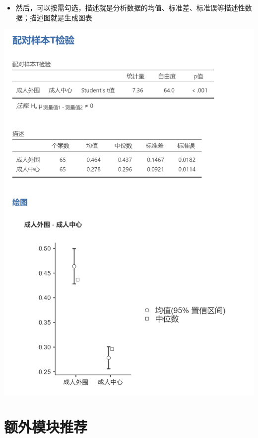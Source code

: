 \documentclass[]{ctexbook}
\providecommand{\tightlist}{%
  \setlength{\itemsep}{0pt}\setlength{\parskip}{0pt}}
\theoremstyle{definition}
\theoremstyle{definition}
\theoremstyle{definition}
\theoremstyle{definition}
\theoremstyle{remark}
\begin{document}
\begin{itemize}
\tightlist
\item
  然后，可以按需勾选，描述就是分析数据的均值、标准差、标准误等描述性数据；描述图就是生成图表
\end{itemize}

\includegraphics{img/jamovi/ttest-results.png}

\section{额外模块推荐}\label{ux989dux5916ux6a21ux5757ux63a8ux8350}
\end{document}
